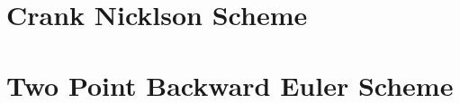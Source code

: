 \documentclass{report}
\numberwithin{equation}{chapter}
\begin{document}
\section{Crank Nicklson Scheme}
\begin{spacing}{1.5}
\end{spacing}
\section{Two Point Backward Euler Scheme}
\begin{spacing}{1.5}
\end{spacing}
\end{document}
